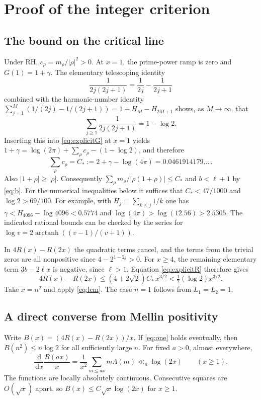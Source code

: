 \documentclass[11pt,a4paper]{article}
\newcommand{\dd}{\,\mathrm d}
\begin{document}
\section{Proof of the integer criterion}\label{sec:lcm}
\subsection*{The bound on the critical line}
Under RH, $c_\rho=m_\rho/|\rho|^2>0$. At $x=1$, the prime-power ramp is zero and $G(1)=1+\gamma$. The elementary telescoping identity
\[
\frac1{2j(2j+1)}=\frac1{2j}-\frac1{2j+1}
\]
combined with the harmonic-number identity
$\sum_{j=1}^{M}(1/(2j)-1/(2j+1))=1+H_M-H_{2M+1}$
shows, as $M\to\infty$, that
\[
  \sum_{j\ge1}\frac1{2j(2j+1)}=1-\log2.
\]
Inserting this into \eqref{eq:explicitG} at $x=1$ yields
$1+\gamma=\log(2\pi)+\sum_\rho c_\rho-(1-\log2)$, and therefore
\begin{equation}\label{eq:cstar}
 \sum_\rho c_\rho=C_*:=2+\gamma-\log(4\pi)=0.0461914179\ldots\, .
\end{equation}
Also $|1+\rho|\ge |\rho|$. Consequently $\sum_\rho m_\rho/|\rho(1+\rho)|\le C_*$ and $b<\ell+1$ by \eqref{eq:b}. For the numerical inequalities below it suffices that $C_*<47/1000$ and $\log2>69/100$. For example, with $H_j=\sum_{k\le j}1/k$ one has $\gamma<H_{4096}-\log4096<0.5774$ and $\log(4\pi)>\log(12.56)>2.5305$. The indicated rational bounds can be checked by the series for $\log v=2\operatorname{arctanh}((v-1)/(v+1))$.

In $4R(x)-R(2x)$ the quadratic terms cancel, and the terms from the trivial zeros are all nonpositive since $4-2^{1-2j}>0$. For $x\ge4$, the remaining elementary term $3b-2\ell x$ is negative, since $\ell>1$. Equation \eqref{eq:explicitR} therefore gives
\begin{equation}\label{eq:forward}
 4R(x)-R(2x)\le (4+2\sqrt2)C_*\,x^{3/2}
                    <\tfrac12(\log2)x^{3/2}.
\end{equation}
Take $x=n^2$ and apply \eqref{eq:lcm}. The case $n=1$ follows from $L_1=L_2=1$.

\subsection*{A direct converse from Mellin positivity}
Write $B(x)=(4R(x)-R(2x))/x$. If \eqref{eq:one} holds eventually, then $B(n^2)\le n\log2$ for all sufficiently large $n$. For fixed $a>0$, almost everywhere,
\begin{equation}\label{eq:slope}
 \frac{\dd}{\dd x}\frac{R(ax)}{x}
   =\frac{1}{x^2}\sum_{m\le ax}m\Lambda(m)\ll_a\log(2x)
   \qquad(x\ge1).
\end{equation}
The functions are locally absolutely continuous. Consecutive squares are $O(\sqrt x)$ apart, so $B(x)\le C\sqrt{x}\log(2x)$ for $x\ge1$.
\end{document}
